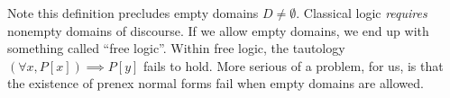 \begin{node}\label{fol-000A}%
Note this definition precludes empty domains $D\neq\emptyset$. Classical
logic \emph{requires} nonempty domains of discourse. If we allow empty
domains, we end up with something called ``free logic''. Within free
logic, the tautology $(\forall x,P[x])\implies P[y]$ fails to hold.
More serious of a problem, for us, is that the existence of prenex
normal forms fail when empty domains are allowed.
\end{node}
